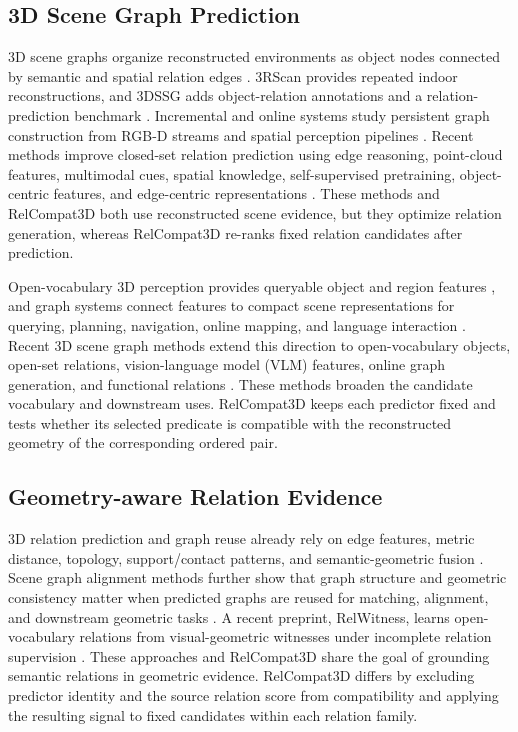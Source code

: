 \subsection{3D Scene Graph Prediction}
3D scene graphs organize reconstructed environments as object nodes connected by semantic and spatial relation edges \cite{armeni20193d}.
3RScan provides repeated indoor reconstructions, and 3DSSG adds object-relation annotations and a relation-prediction benchmark \cite{wald2019rio,wald2020learning}. Incremental and online systems study persistent graph construction from RGB-D streams and spatial perception pipelines \cite{wu2021scenegraphfusion,hughes2022hydra}. Recent methods improve closed-set relation prediction using edge reasoning, point-cloud features, multimodal cues, spatial knowledge, self-supervised pretraining, object-centric features, and edge-centric representations \cite{zhang2021exploiting,feng20233d,wang2023vl,koch2024sgrec3d,heo2026object,ma2026edge}. These methods and RelCompat3D both use reconstructed scene evidence, but they optimize relation generation, whereas RelCompat3D re-ranks fixed relation candidates after prediction.

Open-vocabulary 3D perception provides queryable object and region features \cite{peng2023openscene,takmaz2023openmask3d}, and graph systems connect features to compact scene representations for querying, planning, navigation, online mapping, and language interaction \cite{gu2024conceptgraphs,werby2024hierarchical,maggio2024clio}. Recent 3D scene graph methods extend this direction to open-vocabulary objects, open-set relations, vision-language model (VLM) features, online graph generation, and functional relations \cite{koch2024open3dsg,chen2024clip,hou2025fross,zhang2025open,wang2025open}. These methods broaden the candidate vocabulary and downstream uses. RelCompat3D keeps each predictor fixed and tests whether its selected predicate is compatible with the reconstructed geometry of the corresponding ordered pair. 

\subsection{Geometry-aware Relation Evidence}
3D relation prediction and graph reuse already rely on edge features, metric distance, topology, support/contact patterns, and semantic-geometric fusion \cite{zhang2021exploiting,feng20233d,xie2024sg,huang2025fireplace,shao2025great,sarkar2023sgaligner}. Scene graph alignment methods further show that graph structure and geometric consistency matter when predicted graphs are reused for matching, alignment, and downstream geometric tasks \cite{sarkar2023sgaligner, xie2024sg}. A recent preprint, RelWitness, learns open-vocabulary relations from visual-geometric witnesses under incomplete relation supervision \cite{nguyen2026relwitness}. These approaches and RelCompat3D share the goal of grounding semantic relations in geometric evidence. RelCompat3D differs by excluding predictor identity and the source relation score from compatibility and applying the resulting signal to fixed candidates within each relation family. 

